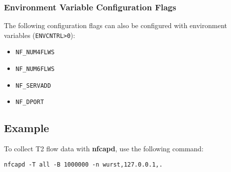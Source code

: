 \documentclass[documentation]{subfiles}
\begin{document}
\subsubsection{Environment Variable Configuration Flags}
The following configuration flags can also be configured with environment variables ({\tt ENVCNTRL>0}):
\begin{itemize}
    \item {\tt NF\_NUM4FLWS}
    \item {\tt NF\_NUM6FLWS}
    \item {\tt NF\_SERVADD}
    \item {\tt NF\_DPORT}
\end{itemize}

\subsection{Example}
To collect T2 flow data with {\bf nfcapd}, use the following command:
\begin{center}
{\tt nfcapd -T all -B 1000000 -n wurst,127.0.0.1,.}
\end{center}

%
\end{document}
